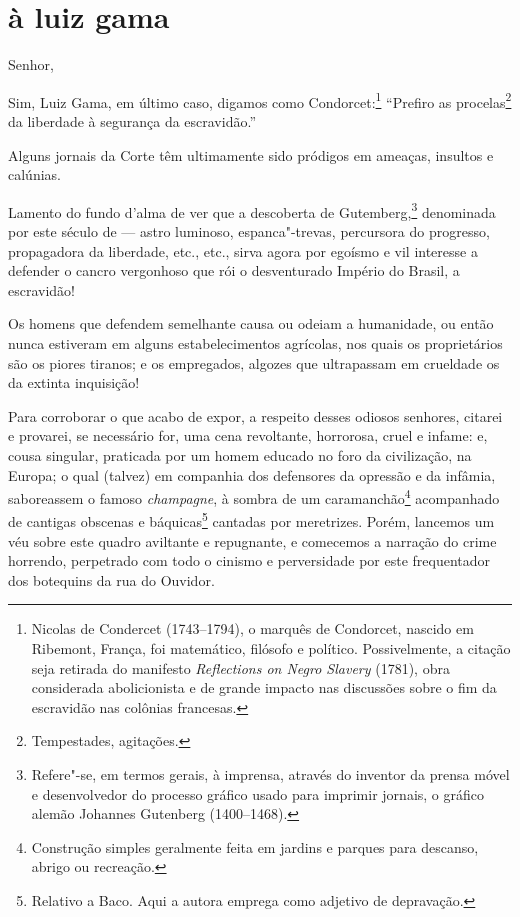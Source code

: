 \section*{à luiz gama}

\noindent{}Senhor,%


Sim, Luiz Gama, em último caso, digamos como Condorcet:\footnote{
  Nicolas de Condercet (1743--1794), o marquês de Condorcet, nascido em
  Ribemont, França, foi matemático, filósofo e político. Possivelmente,
  a citação seja retirada do manifesto \emph{Reflections on Negro
  Slavery} (1781), obra considerada abolicionista e de grande impacto
  nas discussões sobre o fim da escravidão nas colônias francesas.}
``Prefiro as procelas\footnote{Tempestades, agitações.} da liberdade à
segurança da escravidão.''

Alguns jornais da Corte têm ultimamente sido pródigos em ameaças,
insultos e calúnias.

Lamento do fundo d'alma de ver que a descoberta de Gutemberg,\footnote{
  Refere"-se, em termos gerais, à imprensa, através do inventor da prensa
  móvel e desenvolvedor do processo gráfico usado para imprimir jornais,
  o gráfico alemão Johannes Gutenberg (1400--1468).} denominada por este
século de --- astro luminoso, espanca"-trevas, percursora do progresso,
propagadora da liberdade, etc., etc., sirva agora por egoísmo e vil
interesse a defender o cancro vergonhoso que rói o desventurado Império
do Brasil, a escravidão!

Os homens que defendem semelhante causa ou odeiam a humanidade, ou então
nunca estiveram em alguns estabelecimentos agrícolas, nos quais os
proprietários são os piores tiranos; e os empregados, algozes que
ultrapassam em crueldade os da extinta inquisição!

Para corroborar o que acabo de expor, a respeito desses odiosos
senhores, citarei e provarei, se necessário for, uma cena revoltante,
horrorosa, cruel e infame: e, cousa singular, praticada por um homem
educado no foro da civilização, na Europa; o qual (talvez) em companhia
dos defensores da opressão e da infâmia, saboreassem o famoso
\emph{champagne}, à sombra de um caramanchão\footnote{Construção
  simples geralmente feita em jardins e parques para descanso, abrigo ou
  recreação.} acompanhado de cantigas obscenas e báquicas\footnote{
  Relativo a Baco. Aqui a autora emprega como adjetivo de depravação.}
cantadas por meretrizes. Porém, lancemos um véu sobre este quadro
aviltante e repugnante, e comecemos a narração do crime horrendo,
perpetrado com todo o cinismo e perversidade por este frequentador dos
botequins da rua do Ouvidor.

